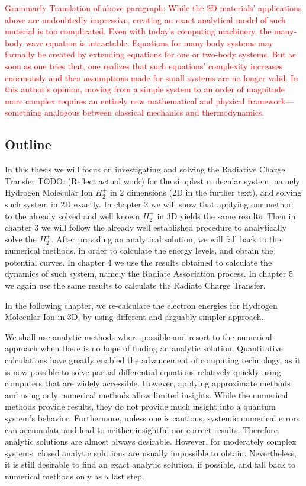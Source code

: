 \textcolor{red}{Grammarly Translation of above paragraph: 
While the 2D materials' applications above are undoubtedly impressive, creating an exact analytical model of such material is too complicated. Even with today's computing machinery, the many-body wave equation is intractable.  Equations for many-body systems may formally be created by extending equations for one or two-body systems. But as soon as one tries that, one realizes that such equations' complexity increases enormously and then assumptions made for small systems are no longer valid. In this author's opinion, moving from a simple system to an order of magnitude more complex requires an entirely new mathematical and physical framework—something analogous between classical mechanics and thermodynamics.} 

\subsection*{Outline}
In this thesis we will focus on investigating and solving the Radiative Charge Transfer TODO: (Reflect actual work) for the simplest molecular system, namely Hydrogen Molecular Ion $ {H_2^{+}}  $ in 2 dimensions (2D in the further text), and solving such system in 2D exactly.  In chapter 2 we will show that applying our method to the already solved and well known $ {H_2^{+}} $ in 3D yields the same results. Then in chapter 3 we will follow  the already well established procedure \cite{Bates1} to analytically solve the $ {H_2^{+}} $. After providing an analytical solution, we will fall back to the numerical methods, in order to calculate the energy levels, and obtain the potential curves. In chapter 4  we use the results obtained to calculate the dynamics of such system, namely the Radiate Association process. In chapter 5 we again use the same results to calculate the Radiate Charge Transfer. 

In the following chapter, we re-calculate the electron energies for Hydrogen Molecular Ion in 3D, by using different and arguably simpler approach.

We shall use analytic methods where possible and resort to the numerical approach when there is no hope of finding an analytic solution.
Quantitative calculations have greatly enabled the advancement of computing technology, as it is now possible to solve partial differential equations relatively quickly using computers that are widely accessible.  However, applying approximate methods and using only numerical methods allow limited insights. While the numerical methods provide results, they do not provide much insight into a quantum system's behavior. Furthermore, unless one is cautious, systemic numerical errors can accumulate and lead to neither insightful nor correct results. Therefore, analytic solutions are almost always desirable. However, for moderately complex systems, closed analytic solutions are usually impossible to obtain. Nevertheless, it is still desirable to find an exact analytic solution,  if possible, and fall back to numerical methods only as a last step. 
